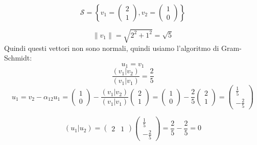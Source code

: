 \documentclass[a4paper]{article}
\theoremstyle{break}
\theoremstyle{break}
\theoremstyle{break}
\theoremstyle{break}
\begin{document}
\begin{example}
  \[
  \mathcal{S} = \left\{ 
    v_1=
    \begin{pmatrix} 
      2\\1
    \end{pmatrix} ,
    v_2=
    \begin{pmatrix} 
      1\\0
    \end{pmatrix} 
  \right\} 
  \] 
  \begin{figure}[H]
    \centering
  \end{figure}

  \[
  \|v_1\| = \sqrt{2^2 + 1^2} = \sqrt{5}
  \] 
  Quindi questi vettori non sono normali, quindi usiamo l'algoritmo di Gram-Schmidt:
  \[
  u_1 = v_1
  \] 
  \[
    \frac{(v_1|v_2)}{(v_1|v_1)} = \frac{2}{5}
  \] 
  \[
    u_1 = v_2 - \alpha_{12} u_1 = \begin{pmatrix} 1\\0 \end{pmatrix} - \frac{(v_1|v_2)}{(v_1|v_1)}\begin{pmatrix} 
    2\\1
  \end{pmatrix} = \begin{pmatrix} 1\\0 \end{pmatrix} - \frac{2}{5} \begin{pmatrix} 2\\1 \end{pmatrix} 
  = \begin{pmatrix} \frac{1}{5}\\-\frac{2}{5} \end{pmatrix} 
  \] 

  \[
    (u_1|u_2) = \begin{pmatrix} 2&1 \end{pmatrix} \begin{pmatrix} 
    \frac{1}{5}\\
    -\frac{2}{5}
  \end{pmatrix} 
  =
  \frac{2}{5}-\frac{2}{5}
  =
  0
  \] 


\end{example}
\end{document}
